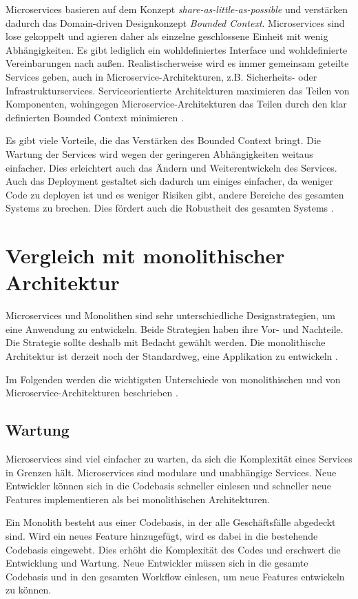 Microservices basieren auf dem Konzept \textit{share-as-little-as-possible} und verstärken dadurch das Domain-driven Designkonzept \textit{Bounded Context}. Microservices sind lose gekoppelt und agieren daher als einzelne geschlossene Einheit mit wenig Abhängigkeiten. Es gibt lediglich ein wohldefiniertes Interface und wohldefinierte Vereinbarungen nach außen. 
Realistischerweise wird es immer gemeinsam geteilte Services geben, auch in Microservice-Architekturen, z.B. Sicherheits- oder Infrastrukturservices. Serviceorientierte Architekturen maximieren das Teilen von Komponenten, wohingegen Microservice-Architekturen das Teilen durch den klar definierten Bounded Context minimieren \cite{MicroservicesVSSOA}.

Es gibt viele Vorteile, die das Verstärken des Bounded Context bringt. Die Wartung der Services wird wegen der geringeren Abhängigkeiten weitaus einfacher. Dies erleichtert auch das Ändern und Weiterentwickeln des Services. Auch das Deployment gestaltet sich dadurch um einiges einfacher, da weniger Code zu deployen ist und es weniger Risiken gibt, andere Bereiche des gesamten Systems zu brechen. Dies fördert auch die Robustheit des gesamten Systems \cite{MicroservicesVSSOA}.


\section{Vergleich mit monolithischer Architektur}
Microservices und Monolithen sind sehr unterschiedliche Designstrategien, um eine Anwendung zu entwickeln. Beide Strategien haben ihre Vor- und Nachteile. Die Strategie sollte deshalb mit Bedacht gewählt werden. Die monolithische Architektur ist derzeit noch der Standardweg,  eine Applikation zu entwickeln \cite{FowlerDSM}.

Im Folgenden werden die wichtigsten Unterschiede von monolithischen und von Microservice-Architekturen beschrieben \cite{MonolithVSMicroservices}.

\subsection{Wartung}
Microservices sind viel einfacher zu warten, da sich die Komplexität eines Services in Grenzen hält. Microservices sind modulare und unabhängige Services. Neue Entwickler können sich in die Codebasis schneller einlesen und schneller neue Features implementieren als bei monolithischen Architekturen.

Ein Monolith besteht aus einer Codebasis, in der alle Geschäftsfälle abgedeckt sind. Wird ein neues Feature hinzugefügt, wird es dabei in die bestehende Codebasis eingewebt. 
Dies erhöht die Komplexität des Codes und erschwert die Entwicklung und Wartung.
Neue Entwickler müssen sich in die gesamte Codebasis und in den gesamten Workflow einlesen, um neue Features entwickeln zu können.

